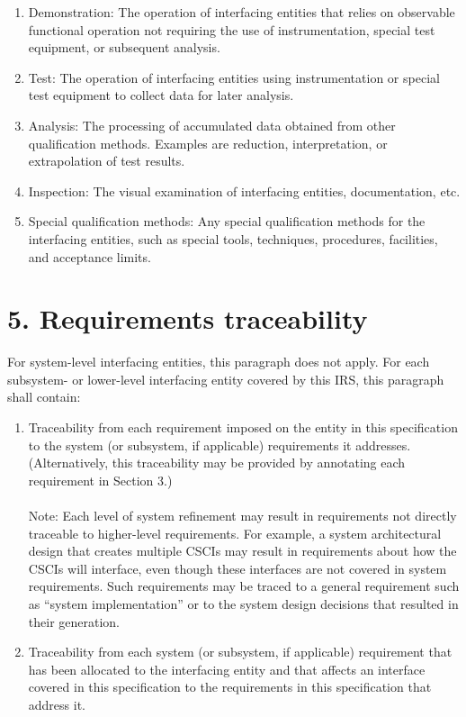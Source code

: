 \begin{enumerate}
\itemsep1pt\parskip0pt
\item
  Demonstration: The operation of interfacing entities that relies on
  observable functional operation not requiring the use of
  instrumentation, special test equipment, or subsequent analysis.
\item
  Test: The operation of interfacing entities using instrumentation or
  special test equipment to collect data for later analysis.
\item
  Analysis: The processing of accumulated data obtained from other
  qualification methods. Examples are reduction, interpretation, or
  extrapolation of test results.
\item
  Inspection: The visual examination of interfacing entities,
  documentation, etc.
\item
  Special qualification methods: Any special qualification methods for
  the interfacing entities, such as special tools, techniques,
  procedures, facilities, and acceptance limits.
\end{enumerate}

\section{5. Requirements traceability}

For system-level interfacing entities, this paragraph does not apply.
For each subsystem- or lower-level interfacing entity covered by this
IRS, this paragraph shall contain:

\begin{enumerate}
\itemsep1pt\parskip0pt
\item
  Traceability from each requirement imposed on the entity in this
  specification to the system (or subsystem, if applicable) requirements
  it addresses. (Alternatively, this traceability may be provided by
  annotating each requirement in Section 3.) \\\\ Note: Each level of
  system refinement may result in requirements not directly traceable to
  higher-level requirements. For example, a system architectural design
  that creates multiple CSCIs may result in requirements about how the
  CSCIs will interface, even though these interfaces are not covered in
  system requirements. Such requirements may be traced to a general
  requirement such as ``system implementation'' or to the system design
  decisions that resulted in their generation.
\item
  Traceability from each system (or subsystem, if applicable)
  requirement that has been allocated to the interfacing entity and that
  affects an interface covered in this specification to the requirements
  in this specification that address it.
\end{enumerate}

